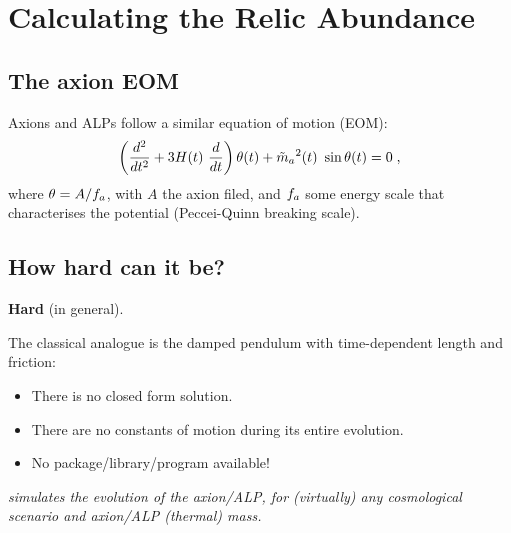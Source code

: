 \documentclass[10pt,utf8,compress,xcolor=dvipsnames]{beamer}
\begin{document}
\section{Calculating the Relic Abundance}
\subsection{The axion EOM}
\begin{frame}{\insertsubsectionhead}
	Axions and ALPs follow a similar equation of motion (EOM):
	\begin{equation*}
		\left( \dfrac{d^2}{d t^2} + 3 H(t) \ \dfrac{d}{d t}  \right) \theta(t) + \tilde m_{a}{}^2(t) \ \sin \theta(t) = 0 \; ,
	\end{equation*}	
	where $\theta= A / f_{a}{}$, with $A$ the axion filed, and $f_{a}{}$ some energy scale that characterises the potential (Peccei-Quinn breaking scale).
	
	
\end{frame}

\subsection{How hard can it be?}
\begin{frame}{\insertsubsectionhead}
	\begin{center}
		\textbf{Hard} (in general).\\[1cm]
	\end{center}	
	
	The classical analogue is the damped pendulum with time-dependent length and friction:
	\begin{itemize}
		\item There is no closed form solution.
		\item There are no constants of motion during its entire evolution.
		\item No package/library/program available!\pause\\[1cm]
	\end{itemize}
	
	\begin{center}
		{\sl \mimes simulates the evolution of the axion/ALP, for (virtually) any cosmological scenario and axion/ALP (thermal) mass.}
	\end{center}		
\end{frame}
\end{document}
